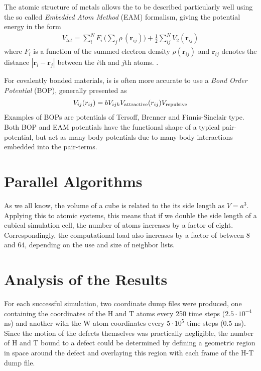 The atomic structure of metals allows the to be described particularly well using the so called \textit{Embedded Atom Method} (EAM) formalism, giving the potential energy in the form
\begin{align}
V_{tot} = \sum_i^N F_i\, \bigg( \sum_j \rho\, (\mathbf{r}_{ij}) \bigg) + \frac{1}{2} \sum^N_{ij} V_2 (\mathbf{r}_{ij})
\end{align}
where  $F_i$ is a function of the summed electron density $\rho (\mathbf{r}_{ij})$ and $\mathbf{r}_{ij}$ denotes the distance $| \mathbf{r}_i - \mathbf{r}_j |$ between the $i$th and $j$th atoms. \cite{EAMmodel,dudarevEAMpotential}. 

For covalently bonded materials, is is often more accurate to use a \textit{Bond Order Potential} (BOP), generally presented as
\begin{align}
V_{ij}(r_{ij}) =bV_{ijk}V_{\rm attractive}(r_{ij}) V_ {\rm repulsive}
\end{align}
Examples of BOPs are potentials of Tersoff, Brenner and Finnis-Sinclair type. \cite{tersoff1988new, brenner1990empirical, finnis1984simple} Both BOP and EAM potentials have the functional shape of a typical pair-potential, but act as many-body potentials due to many-body interactions embedded into the pair-terms.

\section{Parallel Algorithms}
As we all know, the volume of a cube is related to the its side length as $V=a^3$. 
Applying this to atomic systems, this means that if we double the side length of a cubical simulation cell, the number of atoms increases by a factor of eight. 
Correspondingly, the computational load also increases by a factor of between 8 and 64, depending on the use and size of neighbor lists.

\section{Analysis of the Results}
For each successful simulation, two coordinate dump files were produced, one containing the coordinates of the H and T atoms every 250 time steps ($2.5\cdot 10^{-4}$ ns) and another with the W atom coordinates every $5\cdot 10^5$ time steps (0.5 ns).
Since the motion of the defects themselves was practically negligible, the number of H and T bound to a defect could be determined by defining a geometric region in space around the defect and overlaying this region with each frame of the H-T dump file.

